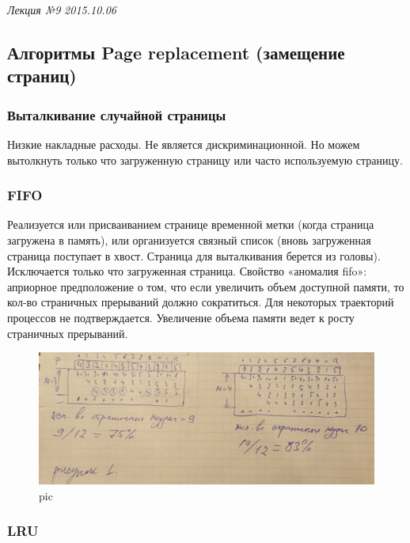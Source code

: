 \clearpage
\begin{flushright}
	\textit{Лекция №9}
	\textit{2015.10.06}
\end{flushright}

\subsection{Алгоритмы Page replacement (замещение страниц)}


\subsubsection{Выталкивание случайной страницы}

Низкие накладные расходы. Не является дискриминационной. Но можем вытолкнуть только что загруженную страницу или часто используемую страницу.

\subsubsection{FIFO}

Реализуется или присваиванием странице временной метки (когда страница загружена в память), или организуется связный список (вновь загруженная страница поступает в хвост. Страница для выталкивания берется из головы). Исключается только что загруженная страница. Свойство «аномалия fifo»: априорное предположение о том, что если увеличить объем доступной памяти, то кол-во страничных прерываний должно сократиться. Для некоторых траекторий процессов не подтверждается. Увеличение объема памяти ведет к росту страничных прерываний.

\begin{figure}[H]
    \centering
    \includegraphics[width=\textwidth]{pic/8.png}
    \caption{pic}
\end{figure}

\subsubsection{LRU}

